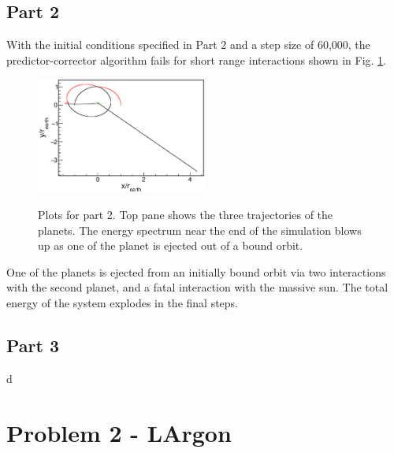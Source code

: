 \documentclass[singlepage,notitlepage,nofootinbib,11pt]{revtex4-1}
\begin{document}
\subsection{Part 2}
With the initial conditions specified in Part 2 and a step size of 60,000, the predictor-corrector algorithm fails for short range interactions shown in Fig. \ref{fig2}.
\begin{figure}[h]
  \centering
  \includegraphics[width=0.5\textwidth]{figures/2r.eps}
  \\
\hfill
  \caption{\label{fig2} Plots for part 2. Top pane shows the three trajectories of the planets. The energy spectrum near the end of the simulation blows up as one of the planet is ejected out of a bound orbit.}
\end{figure}
One of the planets is ejected from an initially bound orbit via two interactions with the second planet, and a fatal interaction with the massive sun. The total energy of the system explodes in the final steps.
\subsection{Part 3}
d

\section{Problem 2 - LArgon}
\end{document}
